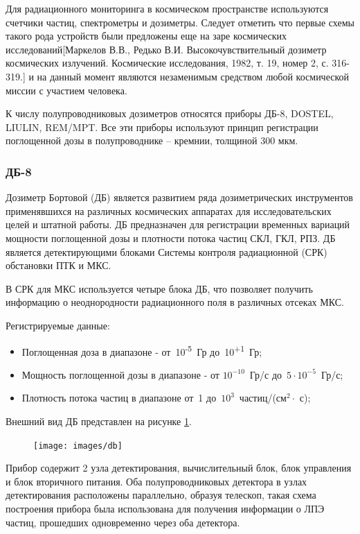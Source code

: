 Для радиационного мониторинга в космическом пространстве используются счетчики частиц, спектрометры и дозиметры. Следует отметить что первые схемы такого рода устройств были предложены еще на заре космических исследований[Маркелов В.В., Редько В.И. Высокочувствительный дозиметр космических излучений. Космические исследования, 1982, т. 19, номер 2, с. 316-319.] и на данный момент являются незаменимым средством любой космической миссии с участием человека.

К числу полупроводниковых дозиметров относятся приборы ДБ-8, DOSTEL, LIULIN, REM/MPT. Все эти приборы используют принцип регистрации поглощенной дозы в полупроводнике – кремнии, толщиной 300 мкм.  

\subsubsection{ДБ-8}

Дозиметр Бортовой (ДБ) является развитием ряда дозиметрических инструментов применявшихся на различных космических аппаратах для исследовательских целей и штатной работы. ДБ предназначен для регистрации временных вариаций мощности поглощенной дозы и плотности потока частиц СКЛ, ГКЛ, РПЗ. ДБ является детектирующими блоками Системы контроля радиационной (СРК) обстановки ПТК и МКС.

В СРК для МКС используется четыре блока ДБ, что позволяет получить информацию о неоднородности радиационного поля в различных отсеках МКС. 

Регистрируемые данные:
\begin{itemize}
	\item 
	Поглощенная доза в диапазоне - от~10\textsuperscript{-5}~Гр  до~10\textsuperscript{+1}~Гр;  
	\item  
	Мощность поглощенной дозы в диапазоне - от $10^{-10}$~Гр/с  до~$5\cdot10^{-5}$~Гр/с;
	\item  
	Плотность потока частиц в диапазоне от~1 до~$ 10^3 $~частиц/(см$^2\cdot$ с);    		
\end{itemize}

Внешний вид ДБ представлен на рисунке \ref{fig:db}.

\begin{figure}
\centering
\texttt{[image: images/db]}
\caption{}
\label{fig:db}
\end{figure}

Прибор содержит 2 узла детектирования, вычислительный блок, блок управления и блок вторичного питания. Оба полупроводниковых детектора в узлах детектирования расположены  параллельно,  образуя телескоп, такая схема построения прибора была использована для получения информации о ЛПЭ частиц, прошедших одновременно через оба детектора.         


